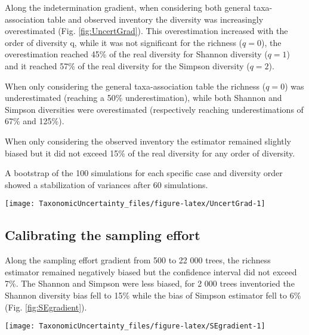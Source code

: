 \documentclass[fleqn,10pt]{ArtEcoFoG} %
\begin{document}
Along the indetermination gradient, when considering both general
taxa-association table and observed inventory the diversity was
increasingly overestimated (Fig. \ref{fig:UncertGrad}). This
overestimation increased with the order of diversity q, while it was not
significant for the richness (\(q=0\)), the overestimation reached 45\%
of the real diversity for Shannon diversity (\(q = 1\)) and it reached
57\% of the real diversity for the Simpson diversity (\(q = 2\)).

When only considering the general taxa-association table the richness
(\(q=0\)) was underestimated (reaching a 50\% underestimation), while
both Shannon and Simpson diversities were overestimated (respectively
reaching underestimations of 67\% and 125\%).

When only considering the observed inventory the estimator remained
slightly biased but it did not exceed 15\% of the real diversity for any
order of diversity.

A bootstrap of the 100 simulations for each specific case and diversity
order showed a stabilization of variances after 60 simulations.

\begin{figure*}
\texttt{[image: TaxonomicUncertainty\_files/figure-latex/UncertGrad-1]} \caption{Richness, Shannon and Simpson estimator bias and 95\%confidence interval along an uncertainty gradient with the association frequencies computed from (a) only expert prior, (b) both expert and observation prior and (c) only observation prior.}\label{fig:UncertGrad}
\end{figure*}

\subsection{Calibrating the sampling
effort}\label{calibrating-the-sampling-effort}

Along the sampling effort gradient from 500 to 22 000 trees, the
richness estimator remained negatively biased but the confidence
interval did not exceed 7\%. The Shannon and Simpson were less biased,
for 2 000 trees inventoried the Shannon diversity bias fell to 15\%
while the bias of Simpson estimator fell to 6\% (Fig.
\ref{fig:SEgradient}).

\begin{figure*}
\texttt{[image: TaxonomicUncertainty\_files/figure-latex/SEgradient-1]} \caption{Richness, Shannon and Simpson estimation (upper panels) and bias compared to real diversity (lower panels) along a sampling effort gradient. Shaded areas are the 95\% confidence intervals.}\label{fig:SEgradient}
\end{figure*}
\end{document}
